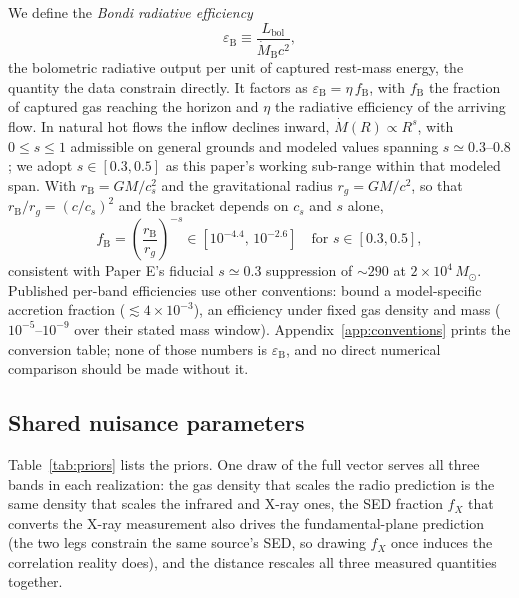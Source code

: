 \documentclass[11pt]{article}
\newcommand{\msun}{\ensuremath{M_\odot}}
\newcommand{\mdotB}{\ensuremath{\dot{M}_{\mathrm{B}}}}
\newcommand{\eps}{\ensuremath{\varepsilon_{\mathrm{B}}}}
\begin{document}
We define the \emph{Bondi radiative efficiency}
\begin{equation}
\eps \equiv \frac{L_{\mathrm{bol}}}{\mdotB c^{2}},
\end{equation}
the bolometric radiative output per unit of captured rest-mass energy, the quantity the data constrain directly. It factors as $\eps = \eta\, f_{\mathrm{B}}$, with $f_{\mathrm{B}}$ the fraction of captured gas reaching the horizon and $\eta$ the radiative efficiency of the arriving flow. In natural hot flows the inflow declines inward, $\dot{M}(R) \propto R^{s}$, with $0 \le s \le 1$ admissible on general grounds \citep{BlandfordBegelman1999} and modeled values spanning $s \simeq 0.3$--$0.8$ \citep{YuanNarayan2014}; we adopt $s \in [0.3, 0.5]$ as this paper's working sub-range within that modeled span. With $r_{\mathrm{B}} = GM/c_{s}^{2}$ and the gravitational radius $r_{g} = GM/c^{2}$, so that $r_{\mathrm{B}}/r_{g} = (c/c_{s})^{2}$ and the bracket depends on $c_{s}$ and $s$ alone,
\begin{equation}
f_{\mathrm{B}} = \left(\frac{r_{\mathrm{B}}}{r_{g}}\right)^{-s} \in [10^{-4.4},\,10^{-2.6}]
\quad\text{for } s \in [0.3, 0.5],
\end{equation}
consistent with Paper E's fiducial $s \simeq 0.3$ suppression of $\sim 290$ at $2\times10^{4}\,\msun$. Published per-band efficiencies use other conventions: \citet{Mahida2026} bound a model-specific accretion fraction ($\lesssim 4\times10^{-3}$), \citet{Haggard2013} an efficiency under fixed gas density and mass ($10^{-5}$--$10^{-9}$ over their stated mass window). Appendix~\ref{app:conventions} prints the conversion table; none of those numbers is $\eps$, and no direct numerical comparison should be made without it.

\subsection{Shared nuisance parameters}
\label{sec:priors}

Table~\ref{tab:priors} lists the priors. One draw of the full vector serves all three bands in each realization: the gas density that scales the radio prediction is the same density that scales the infrared and X-ray ones, the SED fraction $f_{X}$ that converts the X-ray measurement also drives the fundamental-plane prediction (the two legs constrain the same source's SED, so drawing $f_{X}$ once induces the correlation reality does), and the distance rescales all three measured quantities together.
\end{document}
